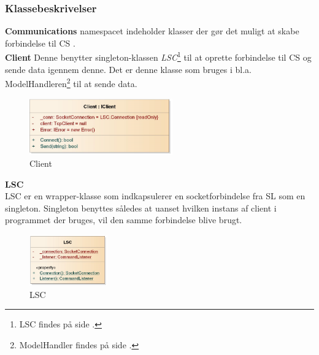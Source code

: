 \subsubsection{Klassebeskrivelser}

\bigskip
\bigskip
\textbf{Communications} namespacet indeholder klasser der gør det muligt at skabe forbindelse til \gls{CS} .\\

\textbf{Client}
Denne benytter singleton-klassen \textit{LSC}\footnote{LSC findes på side \pageref{LSC_Beskrivelse}.} til at oprette forbindelse til \gls{CS} og sende data igennem denne. Det er denne klasse som bruges i bl.a. ModelHandleren{\footnote{ModelHandler findes på side \pageref{Modelhandler_Beskrivelse}.}} til at sende data.
\begin{center}
\begin{figure}[!h]
    \centering
    \includegraphics[width=0.55\textwidth]{Systemdesign/backend/klassebeskrivelser/Images/Client.png}
    \caption{Client}
    \label{fig:Client}
\end{figure}
\end{center}
\label{Client_Beskrivelse}
 \bigskip 


\textbf{LSC}
\label{LSC_Beskrivelse}\\
LSC er en wrapper-klasse som indkapsulerer en socketforbindelse fra \gls{SL} som en singleton. Singleton benyttes således at uanset hvilken instans af  client i programmet der bruges, vil den samme forbindelse blive brugt. 
\begin{center}
\begin{figure}[!h]
    \centering
    \includegraphics[width=0.30\textwidth]{Systemdesign/backend/klassebeskrivelser/Images/LSC.png}
    \caption{LSC }
    \label{fig:LSC}
\end{figure}
\end{center}
\label{LSC_Beskrivelse}
 \bigskip 
